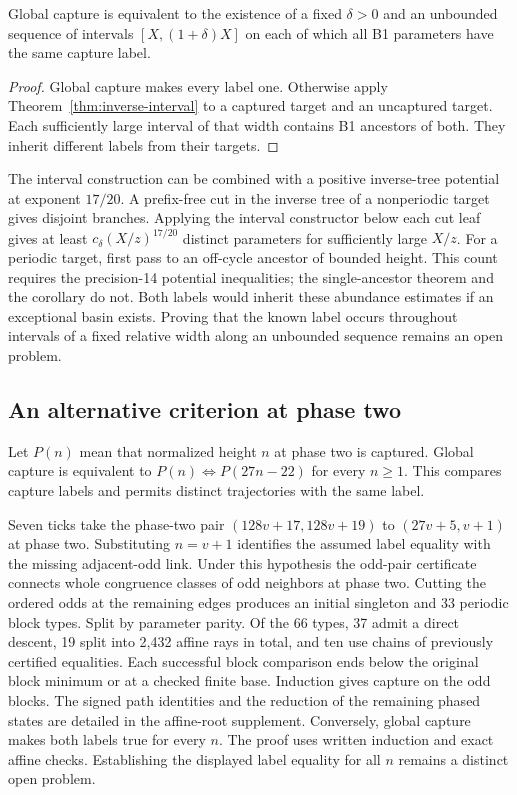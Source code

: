 \begin{corollary}\label{cor:cone}
Global capture is equivalent to the existence of a fixed $\delta>0$
and an unbounded sequence of intervals $[X,(1+\delta)X]$ on each of
which all B1 parameters have the same capture label.
\end{corollary}
\begin{proof}
Global capture makes every label one. Otherwise apply
Theorem~\ref{thm:inverse-interval} to a captured target and an uncaptured
target. Each sufficiently large interval of that width contains B1
ancestors of both. They inherit different labels from their targets.
\end{proof}

The interval construction can be combined with a positive inverse-tree
potential at exponent $17/20$. A prefix-free cut in the inverse tree of
a nonperiodic target gives disjoint branches. Applying the interval
constructor below each cut leaf gives at least
$c_\delta(X/z)^{17/20}$ distinct parameters for sufficiently large $X/z$.
For a periodic target, first pass to an off-cycle ancestor of bounded
height. This count requires the precision-14 potential inequalities;
the single-ancestor theorem and the corollary do not. Both labels
would inherit these abundance estimates if an exceptional basin exists.
Proving that the known label occurs throughout intervals of a fixed
relative width along an unbounded sequence remains an open problem.


\subsection{An alternative criterion at phase two}
\label{sec:affine-root}
Let $P(n)$ mean that normalized height $n$ at phase two is captured.
Global capture is equivalent to $P(n)\Leftrightarrow P(27n-22)$ for
every $n\ge1$. This compares capture labels and permits distinct
trajectories with the same label.

Seven ticks take the phase-two pair $(128v+17,128v+19)$ to
$(27v+5,v+1)$ at phase two. Substituting $n=v+1$ identifies the assumed
label equality with the missing adjacent-odd link. Under this hypothesis
the odd-pair certificate connects whole congruence
classes of odd neighbors at phase two. Cutting the ordered odds at the
remaining edges produces an initial singleton and 33 periodic block
types. Split by parameter parity. Of the 66 types, 37 admit a direct
descent, 19 split into 2,432 affine rays in total, and ten use chains
of previously certified equalities. Each successful block comparison
ends below the original block minimum or at a checked finite base.
Induction gives capture on the odd blocks. The signed path identities
and the reduction of the remaining phased states are detailed in the
affine-root supplement. Conversely, global capture makes both labels
true for every $n$. The proof uses written induction and exact affine
checks. Establishing the displayed label equality for all $n$ remains
a distinct open problem.


